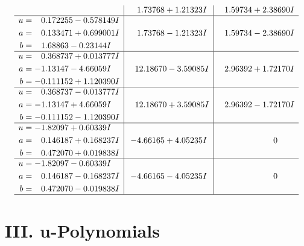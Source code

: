 \documentclass[1p]{elsarticle_modified}
\theoremstyle{definition}
\begin{document}
$$\begin{array}{c|c|c}
 & \phantom{-}1.73768 + 1.21323 I & \phantom{-}1.59734 + 2.38690 I \\ \hline\begin{aligned}
u &= \phantom{-}0.172255 - 0.578149 I \\
a &= \phantom{-}0.133471 + 0.699001 I \\
b &= \phantom{-}1.68863 - 0.23144 I\end{aligned}
 & \phantom{-}1.73768 - 1.21323 I & \phantom{-}1.59734 - 2.38690 I \\ \hline\begin{aligned}
u &= \phantom{-}0.368737 + 0.013777 I \\
a &= -1.13147 - 4.66059 I \\
b &= -0.111152 + 1.120390 I\end{aligned}
 & \phantom{-}12.18670 - 3.59085 I & \phantom{-}2.96392 + 1.72170 I \\ \hline\begin{aligned}
u &= \phantom{-}0.368737 - 0.013777 I \\
a &= -1.13147 + 4.66059 I \\
b &= -0.111152 - 1.120390 I\end{aligned}
 & \phantom{-}12.18670 + 3.59085 I & \phantom{-}2.96392 - 1.72170 I \\ \hline\begin{aligned}
u &= -1.82097 + 0.60339 I \\
a &= \phantom{-}0.146187 + 0.168237 I \\
b &= \phantom{-}0.472070 + 0.019838 I\end{aligned}
 & -4.66165 + 4.05235 I & \phantom{-0.000000 } 0 \\ \hline\begin{aligned}
u &= -1.82097 - 0.60339 I \\
a &= \phantom{-}0.146187 - 0.168237 I \\
b &= \phantom{-}0.472070 - 0.019838 I\end{aligned}
 & -4.66165 - 4.05235 I & \phantom{-0.000000 } 0\\
 \hline 
 \end{array}$$\newpage
\newpage\renewcommand{\arraystretch}{1}
\centering \section*{ III. u-Polynomials}
\end{document}
